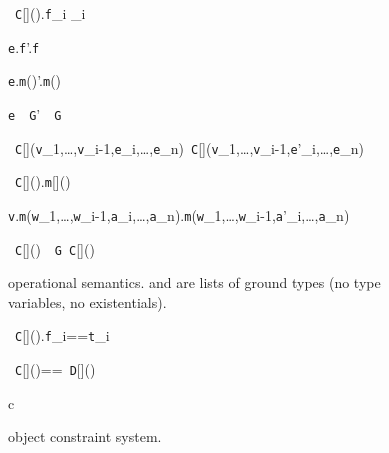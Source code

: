 \begin{figure*}
\vspace{-\bigskipamount}
\begin{minipage}{.33\textwidth}
\quad{}
	{\new~{\tt C}[]().{\tt f}_i _i}

	{{\tt e}.{\tt f}'.{\tt f}}

	{{\tt e}.{\tt m}()'.{\tt m}()}

	{{\tt e}~\as~{\tt G}'~\as~{\tt G}}
\end{minipage}%
\begin{minipage}{.67\textwidth}
\quad{}
	{\new~{\tt C}[]({\tt v}_1,\ldots,{\tt v}_{i-1},{\tt e}_i,\ldots,{\tt e}_n)\derives\new~{\tt C}[]({\tt v}_1,\ldots,{\tt v}_{i-1},{\tt e}'_i,\ldots,{\tt e}_n)}

	{\new~{\tt C}[]().{\tt m}[]()\theta}

	{{\tt v}.{\tt m}({\tt w}_1,\ldots,{\tt w}_{i-1},{\tt a}_i,\ldots,{\tt a}_n).{\tt m}({\tt w}_1,\ldots,{\tt w}_{i-1},{\tt a}'_i,\ldots,{\tt a}_n)}

	{\new~{\tt C}[]()~\as~{\tt G}\derives\new~{\tt C}[]()}
\end{minipage}
\caption{\FXGL{\cdot} operational semantics.  and  are lists of ground types (no type variables, no existentials).}
\label{fig:sos}
\end{figure*}


\begin{figure*}
\vspace{-\bigskipamount}
\begin{minipage}{.3\textwidth}
\quad{}
  {\vdashX \new~{\tt C}[]().{\tt f}_i=={\tt t}_i}
\end{minipage}%
\begin{minipage}{.5\textwidth}
\quad{}
  {\new~{\tt C}[]()==\new~{\tt D}[]()\vdashX \false}
\end{minipage}%
\begin{minipage}{.2\textwidth}
\quad{}
  {\Gamma\vdash c}
\end{minipage}%
\caption{\FXGL{\cdot} object constraint system.}
\label{fig:object}
\end{figure*}


